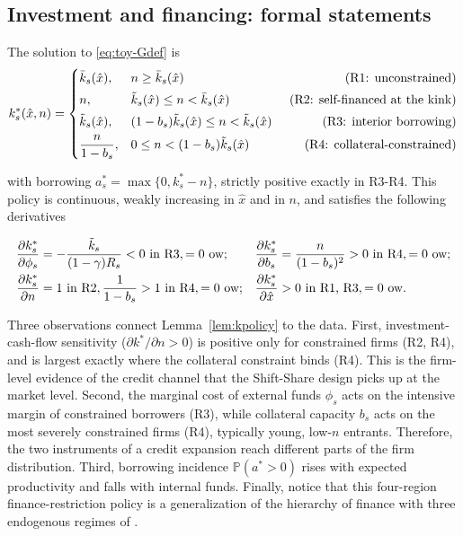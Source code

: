 \documentclass[12pt]{article}
\begin{document}
\subsection{Investment and financing: formal statements}

\begin{lemma}
\label{lem:kpolicy}
The solution to \eqref{eq:toy-Gdef} is
\begin{equation}
  k^{*}_{s}(\hat x,n)=
  \begin{cases}
    \bar{k}_{s}(\hat x), & n \geq \bar{k}_{s}(\hat x)
      \hfill \text{(R1: unconstrained)}\\[3pt]
    n, & \tilde{k}_{s}(\hat x) \le n < \bar{k}_{s}(\hat x)
      \hfill \text{(R2: self-financed at the kink)}\\[3pt]
    \tilde{k}_{s}(\hat x), &
      (1-b_{s})\tilde{k}_{s}(\hat x) \le n <
      \tilde{k}_{s}(\hat x)
      \hfill \qquad \qquad \text{(R3: interior borrowing)}\\[3pt]
    \dfrac{n}{1-b_{s}}, &
      0\le n < (1-b_{s})\tilde{k}_{s}(\hat x)
      \hfill \text{(R4: collateral-constrained)}
  \end{cases}
  \label{eq:toy-kpolicy}
\end{equation}

with borrowing $a^{*}_{s}=\max\{0,k^{*}_{s}-n\}$, strictly positive exactly in R3-R4. This policy is continuous, weakly increasing in $\hat x$ and in $n$, and satisfies the following derivatives

\begin{align}
  \frac{\partial k^{*}_{s}}{\partial \phi_{s}} &=
    -\frac{\tilde{k}_{s}}{(1-\gamma)R_{s}} < 0 \ \text{in R3},
    = 0 \ \text{ow};
  &
  \frac{\partial k^{*}_{s}}{\partial b_{s}} &=
    \frac{n}{(1-b_{s})^{2}} > 0 \ \text{in R4},
    =0 \ \text{ow};
  \notag \\
  \frac{\partial k^{*}_{s}}{\partial n} &= 1 \ \text{in R2},
  \frac{1}{1-b_{s}}>1 \ \text{in R4},
  =0 \ \text{ow};
  &
  \frac{\partial k^{*}_{s}}{\partial \hat x} &> 0
   \ \text{in R1, R3},  =0 \ \text{ow}.
  \label{eq:toy-ksigns}
\end{align}
\end{lemma}
 
Three observations connect Lemma~\ref{lem:kpolicy} to the data. First, investment-cash-flow sensitivity ($\partial k^{*}/\partial n>0$) is positive only for constrained firms (R2, R4), and is largest exactly where the collateral constraint binds (R4). This is the firm-level evidence of the credit channel that the Shift-Share design picks up at the market level. Second, the marginal cost of external funds $\phi_{s}$ acts on the intensive margin of constrained borrowers (R3), while collateral capacity $b_{s}$ acts on the most severely constrained firms (R4), typically young, low-$n$ entrants. Therefore, the two instruments of a credit expansion reach different parts of the firm distribution. Third, borrowing incidence $\mathbb{P}(a^{*}>0)$ rises with expected productivity and falls with internal funds. Finally, notice that this four-region finance-restriction policy is a generalization of the hierarchy of finance with three endogenous regimes of \cite{bond1994dynamic}.
 
\end{document}
